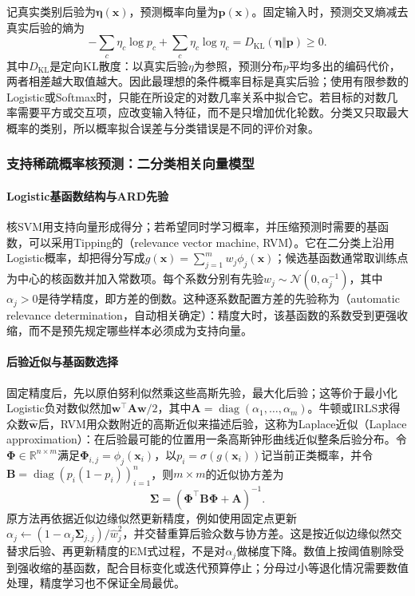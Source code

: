 记真实类别后验为$\bm\eta(\bm x)$，预测概率向量为$\bm p(\bm x)$。固定输入时，预测交叉熵减去真实后验的熵为
\[
 -\sum_c\eta_c\log p_c+\sum_c\eta_c\log\eta_c
 =D_{\mathrm{KL}}(\bm\eta\Vert\bm p)\geq0.
\]
其中$D_{\mathrm{KL}}$是定向KL散度：以真实后验$\eta$为参照，预测分布$p$平均多出的编码代价，两者相差越大取值越大。因此最理想的条件概率目标是真实后验；使用有限参数的Logistic或Softmax时，只能在所设定的对数几率关系中拟合它。若目标的对数几率需要平方或交互项，应改变输入特征，而不是只增加优化轮数。分类又只取最大概率的类别，所以概率拟合误差与分类错误是不同的评价对象。

\subsubsection{支持稀疏概率核预测：二分类相关向量模型}
\label{sec:classification-rvm}

\paragraph{Logistic基函数结构与ARD先验}
核SVM用支持向量形成得分；若希望同时学习概率，并压缩预测时需要的基函数，可以采用Tipping的（relevance vector machine, RVM）。它在二分类上沿用Logistic概率，却把得分写成$g(\bm x)=\sum_{j=1}^m w_j\phi_j(\bm x)$；候选基函数通常取训练点为中心的核函数并加入常数项。每个系数分别有先验$w_j\sim\mathcal N(0,\alpha_j^{-1})$，其中$\alpha_j>0$是待学精度，即方差的倒数。这种逐系数配置方差的先验称为（automatic relevance determination，自动相关确定）：精度大时，该基函数的系数受到更强收缩，而不是预先规定哪些样本必须成为支持向量。

\paragraph{后验近似与基函数选择}
固定精度后，先以原伯努利似然乘这些高斯先验，最大化后验；这等价于最小化Logistic负对数似然加$\bm w^\top\bm A\bm w/2$，其中$\bm A=\operatorname{diag}(\alpha_1,\ldots,\alpha_m)$。牛顿或IRLS求得众数$\hat{\bm w}$后，RVM用众数附近的高斯近似来描述后验，这称为Laplace近似（Laplace approximation）：在后验最可能的位置用一条高斯钟形曲线近似整条后验分布。令$\bm\Phi\in\mathbb R^{n\times m}$满足$\bm\Phi_{i,j}=\phi_j(\bm x_i)$，以$p_i=\sigma(g(\bm x_i))$记当前正类概率，并令$\bm B=\operatorname{diag}(p_i(1-p_i))_{i=1}^n$，则$m\times m$的近似协方差为
\[
  \bm\Sigma=(\bm\Phi^\top\bm B\bm\Phi+\bm A)^{-1}.
\]
原方法再依据近似边缘似然更新精度，例如使用固定点更新$\alpha_j\leftarrow(1-\alpha_j\bm\Sigma_{j,j})/\hat w_j^2$，并交替重算后验众数与协方差。这是按近似边缘似然交替求后验、再更新精度的EM式过程，不是对$\alpha_j$做梯度下降。数值上按阈值剔除受到强收缩的基函数，配合目标变化或迭代预算停止；分母过小等退化情况需要数值处理，精度学习也不保证全局最优。

